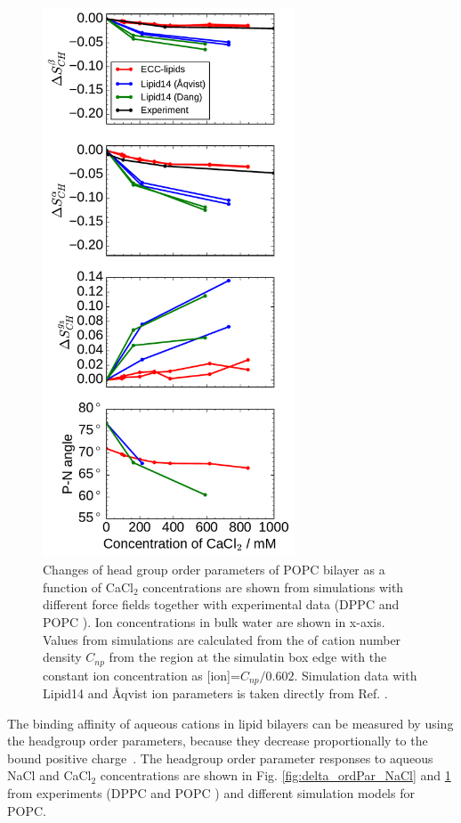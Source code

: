 \documentclass[aip,jcp,twocolumn]{revtex4}
\begin{document}
\begin{figure}[tbp]
  \centering
  \includegraphics[width=7.5cm]{../Fig/ipython_nb/PN_angle_OrdPars-A-B-g3_L14-ECCL17_q80_sig89_CaCl.pdf}
  \caption{\label{fig:delta_ordPar_CaCl}
    Changes of head group order parameters of POPC bilayer as a function of CaCl$_2$ concentrations
    are shown from simulations with different force fields together with experimental data 
    (DPPC \cite{akutsu81} and POPC \cite{altenbach84}). 
    Ion concentrations in bulk water are shown in x-axis. 
    Values from simulations are calculated from the of cation number density $C_{np}$
    from the region at the simulatin box edge with the constant ion concentration as [ion]=$C_{np}/0.602$.
    Simulation data with Lipid14 and \AA{}qvist ion parameters is taken directly from Ref. \cite{catte16}.
  }
\end{figure}

The binding affinity of aqueous cations in lipid 
bilayers can be measured by using the headgroup 
order parameters, because they decrease proportionally  
to the bound positive charge~\cite{seelig87,catte16}. 
The headgroup order parameter responses 
to aqueous NaCl and CaCl$_2$ concentrations 
are shown in Fig. \ref{fig:delta_ordPar_NaCl} and \ref{fig:delta_ordPar_CaCl}
from experiments (DPPC \cite{akutsu81} 
and POPC \cite{altenbach84}) and different simulation models for POPC. 
\end{document}
